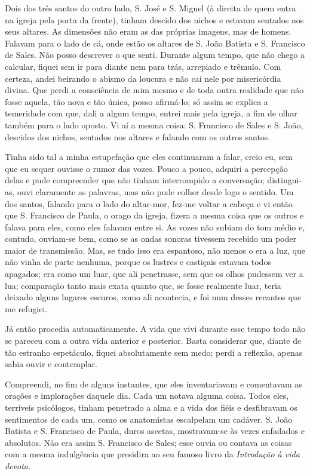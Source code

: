 Dois dos três santos do outro lado, S. José e S. Miguel (à direita de
quem entra na igreja pela porta da frente), tinham descido dos nichos e
estavam sentados nos seus altares. As dimensões não eram as das próprias
imagens, mas de homens. Falavam para o lado de cá, onde estão os altares
de S. João Batista e S. Francisco de Sales. Não posso descrever o que
senti. Durante algum tempo, que não chego a calcular, fiquei sem ir para
diante nem para trás, arrepiado e trêmulo. Com certeza, andei beirando o
abismo da loucura e não caí nele por misericórdia divina. Que perdi a
consciência de mim mesmo e de toda outra realidade que não fosse aquela,
tão nova e tão única, posso afirmá-lo; só assim se explica a temeridade
com que, dali a algum tempo, entrei mais pela igreja, a fim de olhar
também para o lado oposto. Vi aí a mesma coisa: S. Francisco de Sales e
S. João, descidos dos nichos, sentados nos altares e falando com os
outros santos.

Tinha sido tal a minha estupefação que eles continuaram a falar, creio
eu, sem que eu sequer ouvisse o rumor das vozes. Pouco a pouco, adquiri
a percepção delas e pude compreender que não tinham interrompido a
conversação; distingui-as, ouvi claramente as palavras, mas não pude
colher desde logo o sentido. Um dos santos, falando para o lado do
altar-mor, fez-me voltar a cabeça e vi então que S. Francisco de Paula,
o orago da igreja, fizera a mesma coisa que os outros e falava para
eles, como eles falavam entre si. As vozes não subiam do tom médio e,
contudo, ouviam-se bem, como se as ondas sonoras tivessem recebido um
poder maior de transmissão. Mas, se tudo isso era espantoso, não menos o
era a luz, que não vinha de parte nenhuma, porque os lustres e castiçais
estavam todos apagados; era como um luar, que ali penetrasse, sem que os
olhos pudessem ver a lua; comparação tanto mais exata quanto que, se
fosse realmente luar, teria deixado alguns lugares escuros, como ali
acontecia, e foi num desses recantos que me refugiei.

Já então procedia automaticamente. A vida que vivi durante esse tempo
todo não se pareceu com a outra vida anterior e posterior. Basta
considerar que, diante de tão estranho espetáculo, fiquei absolutamente
sem medo; perdi a reflexão, apenas sabia ouvir e contemplar.

Compreendi, no fim de alguns instantes, que eles inventariavam e
comentavam as orações e implorações daquele dia. Cada um notava alguma
coisa. Todos eles, terríveis psicólogos, tinham penetrado a alma e a
vida dos fiéis e desfibravam os sentimentos de cada um, como os
anatomistas escalpelam um cadáver. S. João Batista e S. Francisco de
Paula, duros ascetas, mostravam-se às vezes enfadados e absolutos. Não
era assim S. Francisco de Sales; esse ouvia ou contava as coisas com a
mesma indulgência que presidira ao seu famoso livro da \emph{Introdução
à vida devota.}

